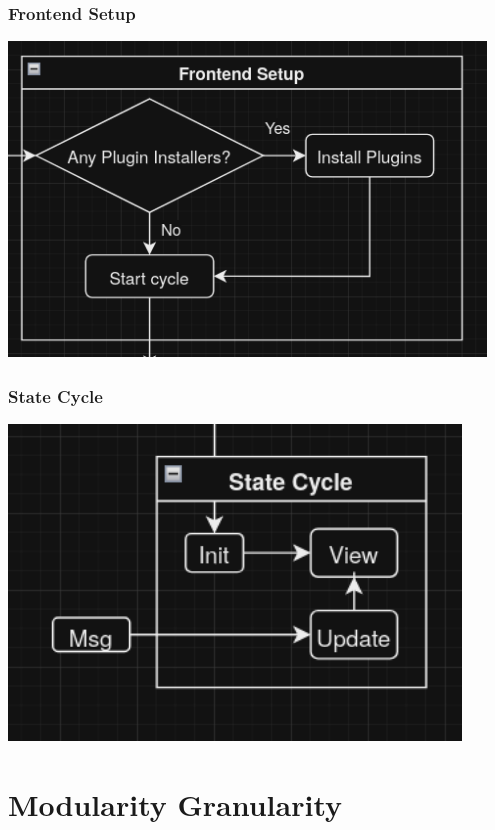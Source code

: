 \documentclass{beamer}
\begin{document}
\begin{frame}
  \frametitle{Frontend Setup}
  \centering
  \includegraphics[width=0.95\textwidth]{../../pics/frontend-setup.png}
\end{frame}

\begin{frame}
  \frametitle{State Cycle}
  \centering
  \includegraphics[width=0.9\textwidth]{../../pics/state-cycle.png}
\end{frame}

\section{Modularity  Granularity}
\SectionPage
\end{document}
